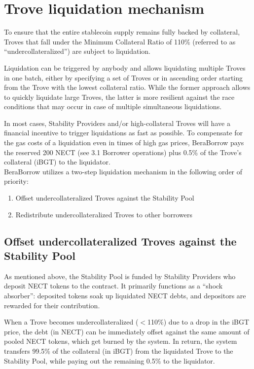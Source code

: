 \documentclass{article}
\begin{document}
\section{Trove liquidation mechanism}
To ensure that the entire stablecoin supply remains fully backed by collateral, Troves that fall under the Minimum Collateral Ratio of 110\% (referred to as “undercollateralized”) are subject to liquidation.

Liquidation can be triggered by anybody and allows liquidating multiple Troves in one batch, either by specifying a set of Troves or in ascending order starting from the Trove with the lowest collateral ratio. While the former approach allows to quickly liquidate large Troves, the latter is more resilient against the race conditions that may occur in case of multiple simultaneous liquidations.

In most cases, Stability Providers and/or high-collateral Troves will have a financial incentive to trigger liquidations as fast as possible. To compensate for the gas costs of a liquidation even in times of high gas prices, BeraBorrow pays the reserved 200 NECT (see 3.1 Borrower operations) plus 0.5\% of the Trove’s collateral (iBGT) to the liquidator.
\\

BeraBorrow utilizes a two-step liquidation mechanism in the following order of priority:
\begin{enumerate}
    \item Offset undercollateralized Troves against the Stability Pool
    \item Redistribute undercollateralized Troves to other borrowers
\end{enumerate}

\subsection{Offset undercollateralized Troves against the Stability Pool}
As mentioned above, the Stability Pool is funded by Stability Providers who deposit NECT tokens to the contract. It primarily functions as a “shock absorber”: deposited tokens soak up liquidated NECT debts, and depositors are rewarded for their contribution. 

When a Trove becomes undercollateralized ($<$110\%) due to a drop in the iBGT price, the debt (in NECT) can be immediately offset against the same amount of pooled NECT tokens, which get burned by the system. In return, the system transfers 99.5\% of the collateral (in iBGT) from the liquidated Trove to the Stability Pool, while paying out the remaining 0.5\% to the liquidator.\\
\end{document}
